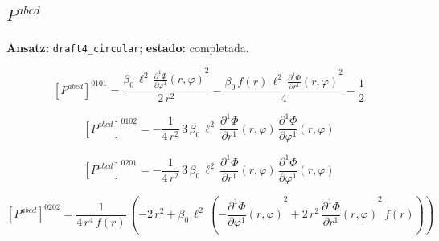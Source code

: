 \documentclass[11pt]{article}
\begin{document}
\subsection*{$ P^{abcd} $}
\textbf{Ansatz:} \texttt{draft4\_circular}; \textbf{estado:} completada.\par
\begin{dmath*}[breakdepth={5}]
\left[P^{abcd}\right]^{0101} = \frac{\beta_{0}\,{\ell}^{2}\,{\frac{\partial^{1} \Phi}{\partial \varphi^{1}}\!\left(r, \varphi\right)}^{2}}{2\,{r}^{2}} - \frac{\beta_{0}\,f\!\left(r\right)\,{\ell}^{2}\,{\frac{\partial^{1} \Phi}{\partial r^{1}}\!\left(r, \varphi\right)}^{2}}{4} - \frac{1}{2}
\end{dmath*}
\par\smallskip
\begin{dmath*}[breakdepth={5}]
\left[P^{abcd}\right]^{0102} = -\frac{1}{4\,{r}^{2}}\,3\,\beta_{0}\,{\ell}^{2}\,\frac{\partial^{1} \Phi}{\partial r^{1}}\!\left(r, \varphi\right)\,\frac{\partial^{1} \Phi}{\partial \varphi^{1}}\!\left(r, \varphi\right)
\end{dmath*}
\par\smallskip
\begin{dmath*}[breakdepth={5}]
\left[P^{abcd}\right]^{0201} = -\frac{1}{4\,{r}^{2}}\,3\,\beta_{0}\,{\ell}^{2}\,\frac{\partial^{1} \Phi}{\partial r^{1}}\!\left(r, \varphi\right)\,\frac{\partial^{1} \Phi}{\partial \varphi^{1}}\!\left(r, \varphi\right)
\end{dmath*}
\par\smallskip
\begin{dmath*}[breakdepth={5}]
\left[P^{abcd}\right]^{0202} = \frac{1}{4\,{r}^{4}\,f\!\left(r\right)}\,\left(-2\,{r}^{2} + \beta_{0}\,{\ell}^{2}\,\left(-{\frac{\partial^{1} \Phi}{\partial \varphi^{1}}\!\left(r, \varphi\right)}^{2} + 2\,{r}^{2}\,{\frac{\partial^{1} \Phi}{\partial r^{1}}\!\left(r, \varphi\right)}^{2}\,f\!\left(r\right)\right)\right)
\end{dmath*}
\end{document}
